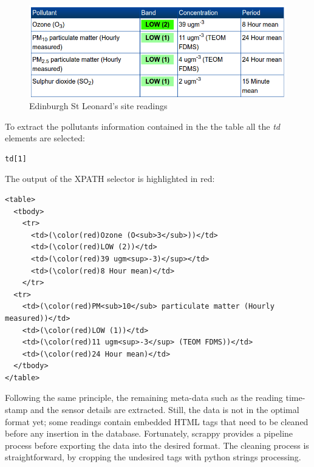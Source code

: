 \begin{figure}[H]
\begin{adjustbox}{width=.5\textwidth,center=\textwidth}
  \centering
  \includegraphics[scale=1]{images/site_readings.png}
\end{adjustbox}
  \caption[Edinburgh St Leonard's site readings]{Edinburgh St Leonard's site readings \footnotemark}
  \label{fig:pollution_site readings}
\end{figure}

To extract the pollutants information contained in the the table all the \textit{td} elements are selected: 

{\centering
\begin{BVerbatim}
td[1]
\end{BVerbatim}
\par
}\bigskip

The output of the XPATH selector is highlighted in red: 

\begin{Verbatim}[fontsize=\small,commandchars=\\\(\)]
<table>
  <tbody>
    <tr>
      <td>(\color(red)Ozone (O<sub>3</sub>))</td>
      <td>(\color(red)LOW (2))</td>
      <td>(\color(red)39 ugm<sup>-3)</sup></td>
      <td>(\color(red)8 Hour mean)</td>
    </tr>
  <tr>
    <td>(\color(red)PM<sub>10</sub> particulate matter (Hourly measured))</td>
    <td>(\color(red)LOW (1))</td>
    <td>(\color(red)11 ugm<sup>-3</sup> (TEOM FDMS))</td>
    <td>(\color(red)24 Hour mean)</td>
  </tbody>
</table>                
\end{Verbatim}

Following the same principle, the remaining meta-data such as the reading time-stamp and the sensor details are extracted. Still, the data is not in the optimal format yet; some readings contain embedded HTML tags that need to be cleaned before any insertion in the database. Fortunately, scrappy provides a pipeline process before exporting the data into the desired format. The cleaning process is straightforward, by cropping the undesired tags with python strings processing. 

